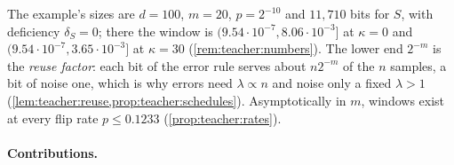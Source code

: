\smallskip\noindent The example's sizes are $d=100$, $m=20$, $p=2^{-10}$ and $11{,}710$ bits for $S$, with deficiency $\delta_S=0$; there the window is $(9.54\cdot10^{-7},8.06\cdot10^{-3}]$ at $\kappa=0$ and $(9.54\cdot10^{-7},3.65\cdot10^{-3}]$ at $\kappa=30$ (\cref{rem:teacher:numbers}). The lower end $2^{-m}$ is the \emph{reuse factor}: each bit of the error rule serves about $n2^{-m}$ of the $n$ samples, a bit of noise one, which is why errors need $\lambda\propto n$ and noise only a fixed $\lambda>1$ (\cref{lem:teacher:reuse,prop:teacher:schedules}). Asymptotically in $m$, windows exist at every flip rate $p\le0.1233$ (\cref{prop:teacher:rates}).

\paragraph{Contributions.}
